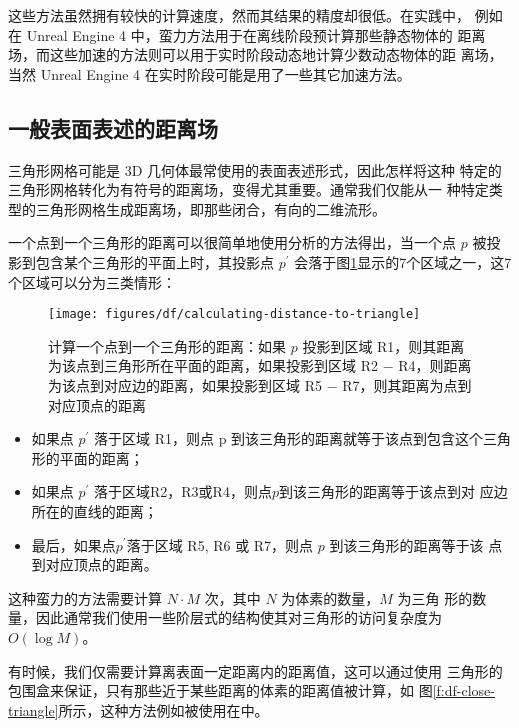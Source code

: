 这些方法虽然拥有较快的计算速度，然而其结果的精度却很低。在实践中， 例如在 Unreal Engine 4 中，蛮力方法用于在离线阶段预计算那些静态物体的 距离场，而这些加速的方法则可以用于实时阶段动态地计算少数动态物体的距 离场，当然 Unreal Engine 4 在实时阶段可能是用了一些其它加速方法。



\subsection{一般表面表述的距离场}
三角形网格可能是 3D 几何体最常使用的表面表述形式，因此怎样将这种 特定的三角形网格转化为有符号的距离场，变得尤其重要。通常我们仅能从一 种特定类型的三角形网格生成距离场，即那些闭合，有向的二维流形。

一个点到一个三角形的距离可以很简单地使用分析的方法得出，当一个点 $p$ 被投影到包含某个三角形的平面上时，其投影点 $p^{'}$ 会落于图\ref{f:df-calculating-distance-to-triangle}显示的7个区域之一，这7个区域可以分为三类情形\cite{a:3d-distance-fields-a-survey}：

\begin{figure}
	\sidecaption
	\texttt{[image: figures/df/calculating-distance-to-triangle]}
	\caption{计算一个点到一个三角形的距离：如果 $p$ 投影到区域 R1，则其距离为该点到三角形所在平面的距离，如果投影到区域 R2 − R4，则距离为该点到对应边的距离，如果投影到区域 R5 − R7，则其距离为点到对应顶点的距离}
	\label{f:df-calculating-distance-to-triangle}
\end{figure}

\begin{itemize}
	\item 如果点 $p^{'}$ 落于区域 R1，则点 p 到该三角形的距离就等于该点到包含这个三角形的平面的距离；
	\item 如果点 $p^{'}$ 落于区域R2，R3或R4，则点$p$到该三角形的距离等于该点到对 应边所在的直线的距离；
	\item 最后，如果点$p^{'}$落于区域 R5, R6 或 R7，则点 $p$ 到该三角形的距离等于该 点到对应顶点的距离。
\end{itemize}

这种蛮力的方法需要计算 $N \cdot M$ 次，其中 $N$ 为体素的数量，$M$ 为三角 形的数量，因此通常我们使用一些阶层式的结构使其对三角形的访问复杂度为 $O(\log M )$。

有时候，我们仅需要计算离表面一定距离内的距离值，这可以通过使用 三角形的包围盒来保证，只有那些近于某些距离的体素的距离值被计算，如 图\ref{f:df-close-triangle}所示，这种方法例如被使用在\cite{a:Incremental-Triangle-Voxelization}中。

